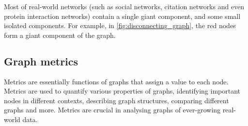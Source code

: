 

Most of real-world networks (such as social networks, citation networks and even protein interaction networks) contain a single giant component, and some small isolated components.
For example, in \autoref{fig:disconnecting_graph}, the red nodes form a giant component of the graph.


%
%
%
%

\subsection{Graph metrics}

Metrics are essentially functions of graphs that assign a value to each node.
Metrics are used to quantify various properties of graphs, identifying important nodes in different contexts, describing graph structures, comparing different graphs and more.
Metrics are crucial in analysing graphs of ever-growing real-world data.

